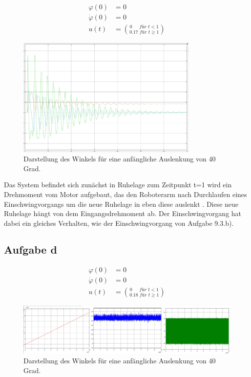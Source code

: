 \documentclass[10pt]{scrartcl}
\begin{document}
\begin{align}
\varphi  (0) &= 0 \\
\dot \varphi (0) &= 0 \\
u(t)  &= \binom{0\,\,\,\,\,\,\,\,\, für\,\, t<1}{0.17\,\, für\,\, t \geq 1}
\end{align}
\begin{figure}[H]
	\centering
	\includegraphics[width=0.8\textwidth]{Aufgabe9c.jpeg}
	\caption{Darstellung des Winkels für eine anfängliche Auslenkung von 40 Grad. }
	\label{img:grafik-dummy}
\end{figure}
Das System befindet sich zunächst in Ruhelage
zum Zeitpunkt t=1 wird ein Drehmoment vom Motor aufgebaut,
das den Roboterarm nach Durchlaufen eines Einschwingvorgangs 
um die neue Ruhelage in eben diese auslenkt . Diese neue Ruhelage hängt von dem Eingangsdrehmoment ab. Der Einschwingvorgang hat dabei ein gleiches Verhalten, wie der Einschwingvorgang von Aufgabe 9.3.b). 


%






\subsection{Aufgabe d}
\begin{align}
\varphi  (0) &= 0 \\
\dot \varphi (0) &= 0 \\
u(t)  &= \binom{0\,\,\,\,\,\,\,\,\, für\,\, t<1}{0.18\,\, für\,\, t \geq 1}
\end{align}
\begin{figure}[H]
	\centering
	\includegraphics[width=1\textwidth]{Aufgabe9d.png}
	\caption{Darstellung des Winkels für eine anfängliche Auslenkung von 40 Grad. }
	\label{img:grafik-dummy}
\end{figure}
\end{document}
